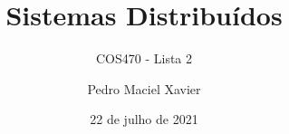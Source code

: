 \documentclass[brazil, answer]{homework}
\title{Sistemas Distribuídos}
\subtitle{COS470 - Lista 2}
\author{Pedro Maciel Xavier}
\date{22 de julho de 2021}
\begin{document}
\cmaketitle

    
    
\end{document}
